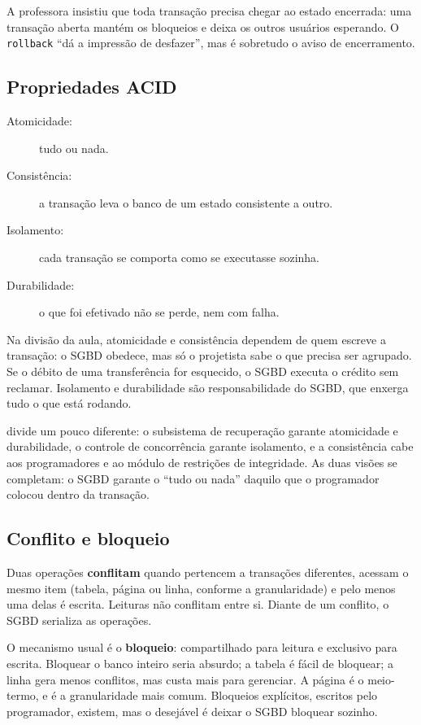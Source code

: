 A professora insistiu que toda transação precisa chegar ao estado
encerrada: uma transação aberta mantém os bloqueios e deixa os outros
usuários esperando. O \texttt{rollback} ``dá a impressão de desfazer'',
mas é sobretudo o aviso de encerramento.

\subsection{Propriedades ACID}

\begin{description}
	\item[Atomicidade:] tudo ou nada.
	\item[Consistência:] a transação leva o banco de um estado consistente
	a outro.
	\item[Isolamento:] cada transação se comporta como se executasse
	sozinha.
	\item[Durabilidade:] o que foi efetivado não se perde, nem com falha.
\end{description}

Na divisão da aula, atomicidade e consistência dependem de quem escreve
a transação: o SGBD obedece, mas só o projetista sabe o que precisa ser
agrupado. Se o débito de uma transferência for esquecido, o SGBD executa
o crédito sem reclamar. Isolamento e durabilidade são responsabilidade
do SGBD, que enxerga tudo o que está rodando.

\textcite[seção 21.3]{Elmasri2011} divide um pouco diferente: o
subsistema de recuperação garante atomicidade e durabilidade, o controle
de concorrência garante isolamento, e a consistência cabe aos
programadores e ao módulo de restrições de integridade. As duas visões
se completam: o SGBD garante o ``tudo ou nada'' daquilo que o
programador colocou dentro da transação.

\subsection{Conflito e bloqueio}

Duas operações \textbf{conflitam} quando pertencem a transações
diferentes, acessam o mesmo item (tabela, página ou linha, conforme a
granularidade) e pelo menos uma delas é escrita. Leituras não conflitam
entre si. Diante de um conflito, o SGBD serializa as operações.

O mecanismo usual é o \textbf{bloqueio}: compartilhado
para leitura e exclusivo para escrita. Bloquear o banco inteiro seria
absurdo; a tabela é fácil de bloquear; a linha gera menos conflitos, mas
custa mais para gerenciar. A página é o meio-termo, e é a granularidade
mais comum. Bloqueios explícitos, escritos pelo programador, existem,
mas o desejável é deixar o SGBD bloquear sozinho.

